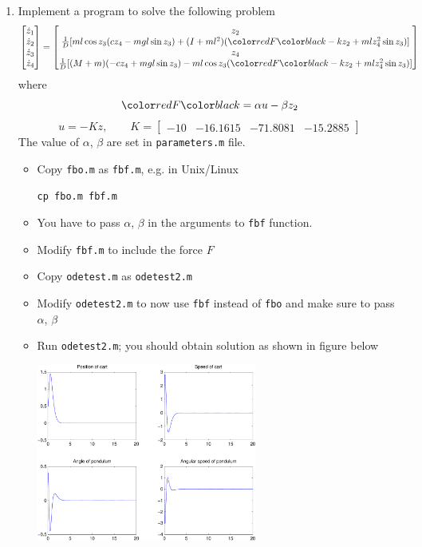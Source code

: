 \documentclass[11pt,xcolor=svgnames,onlymath]{beamer}
\begin{document}
\begin{frame}
\begin{enumerate}
\item Implement a program to solve the following problem
{\footnotesize
\[
\begin{bmatrix}
\dz_1 \\ \dz_2 \\ \dz_3 \\ \dz_4 \end{bmatrix} = \begin{bmatrix}
z_2 \\
\frac{1}{D} [ m l \cos z_3 (c z_4 - mgl\sin z_3) + (I+ml^2)(\clr{red}{F} - k z_2 + ml      z_4^2 \sin      z_3)] \\
z_4 \\
\frac{1}{D}[ (M+m)(-c z_4 + mgl\sin z_3) - ml\cos z_3 (\clr{red}{F} - k z_2 + ml z_4^2     \sin z_3)]
\end{bmatrix}
\]
}
where
\[
\clr{red}{F} = \alpha u - \beta z_2
\]
\[
u = -Kz, \qquad K = \begin{bmatrix}
-10 & -16.1615 & -71.8081 & -15.2885 \end{bmatrix}
\]
The value of $\alpha$, $\beta$ are set in {\tt parameters.m} file.
\begin{itemize}

\item Copy {\tt fbo.m} as {\tt fbf.m}, e.g. in Unix/Linux\\
\begin{center}
{\tt cp fbo.m fbf.m}
\end{center}

\item You have to pass $\alpha$, $\beta$ in the arguments to {\tt fbf} function.

\item Modify {\tt fbf.m} to include the force $F$

\item Copy {\tt odetest.m} as {\tt odetest2.m}

\item Modify {\tt odetest2.m} to now use {\tt fbf} instead of {\tt fbo} and make sure to pass $\alpha$, $\beta$

\item Run {\tt odetest2.m}; you should obtain solution as shown in figure below
\begin{center}
\includegraphics[width=0.6\textwidth]{odetest2}
\end{center}


\end{itemize}
\end{enumerate}
\end{frame}
\end{document}
